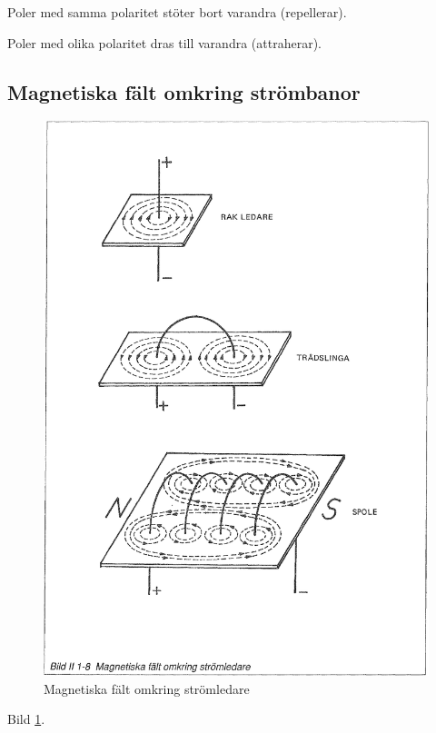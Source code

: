 Poler med samma polaritet stöter bort varandra (repellerar).

Poler med olika polaritet dras till varandra (attraherar).

\subsection{Magnetiska fält omkring strömbanor}

\begin{figure}
\begin{center}
\includegraphics[width=14cm]{images/bild_2_1-08}
\caption{Magnetiska fält omkring strömledare}
\label{fig:BildII1-8}
\end{center}
\end{figure}

Bild \ref{fig:BildII1-8}.

